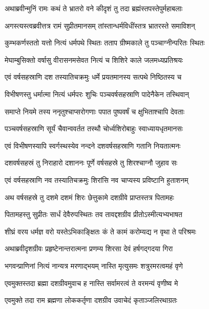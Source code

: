 
\twolineshloka
{अथाब्रवीन्मुनिं रामः कथं ते भ्रातरो वने}
{कीदृशं तु तदा ब्रह्मंस्तपस्तेपुर्महाबलाः} %

\twolineshloka
{अगस्त्यस्त्वब्रवीत्तत्र रामं सुप्रीतमानसम्}
{तांस्तान्धर्मविधींस्तत्र भ्रातरस्ते समाविशन्} %

\twolineshloka
{कुम्भकर्णस्ततो यत्तो नित्यं धर्मपथे स्थितः}
{तताप ग्रीष्मकाले तु पञ्चाग्नीन्परितः स्थितः} %

\twolineshloka
{मेघाम्बुसिक्तो वर्षासु वीरासनमसेवत}
{नित्यं च शिशिरे काले जलमध्यप्रतिश्रयः} %

\twolineshloka
{एवं वर्षसहस्राणि दश तस्यातिचक्रमुः}
{धर्मे प्रयतमानस्य सत्पथे निष्ठितस्य च} %

\twolineshloka
{विभीषणस्तु धर्मात्मा नित्यं धर्मपरः शुचिः}
{पञ्चवर्षसहस्राणि पादेनैकेन तस्थिवान्} %

\twolineshloka
{समाप्ते नियमे तस्य ननृतुश्चाप्सरोगणाः}
{पपात पुष्पवर्षं च क्षुभिताश्चापि देवताः} %

\twolineshloka
{पञ्चवर्षसहस्राणि सूर्यं चैवान्ववर्तत}
{तस्थौ चोर्ध्वशिरोबाहुः स्वाध्यायधृतमानसः} %

\twolineshloka
{एवं विभीषणस्यापि स्वर्गस्थस्येव नन्दने}
{दशवर्षसहस्राणि गतानि नियतात्मनः} %

\twolineshloka
{दशवर्षसहस्रं तु निराहारो दशाननः}
{पूर्णे वर्षसहस्रे तु शिरश्चाग्नौ जुहाव सः} %

\twolineshloka
{एवं वर्षसहस्राणि नव तस्यातिचक्रमुः}
{शिरांसि नव चाप्यस्य प्रविष्टानि हुताशनम्} %

\twolineshloka
{अथ वर्षसहस्रे तु दशमे दशमं शिरः}
{छेत्तुकामे दशग्रीवे प्राप्तस्तत्र पितामहः} %

\twolineshloka
{पितामहस्तु सुप्रीतः सार्धं देवैरुपस्थितः}
{तव तावद्दशग्रीव प्रीतोऽस्मीत्यभ्यभाषत} %

\twolineshloka
{शीघ्रं वरय धर्मज्ञ वरो यस्तेऽभिकाङ्क्षितः}
{कं ते कामं करोम्यद्य न वृथा ते परिश्रमः} %

\twolineshloka
{अथाब्रवीदृशग्रीवः प्रहृष्टेनान्तरात्मना}
{प्रणम्य शिरसा देवं हर्षगद्गदया गिरा} %

\twolineshloka
{भगवन्प्राणिनां नित्यं नान्यत्र मरणाद्भयम्}
{नास्ति मृत्युसमः शत्रुरमरत्वमहं वृणे} %

\twolineshloka
{एवमुक्तस्तदा ब्रह्मा दशग्रीवमुवाच ह}
{नास्ति सर्वामरत्वं ते वरमन्यं वृणीष्व मे} %

\twolineshloka
{एवमुक्ते तदा राम ब्रह्मणा लोककर्तृणा}
{दशग्रीव उवाचेदं कृताञ्जलिरथाग्रतः} %

